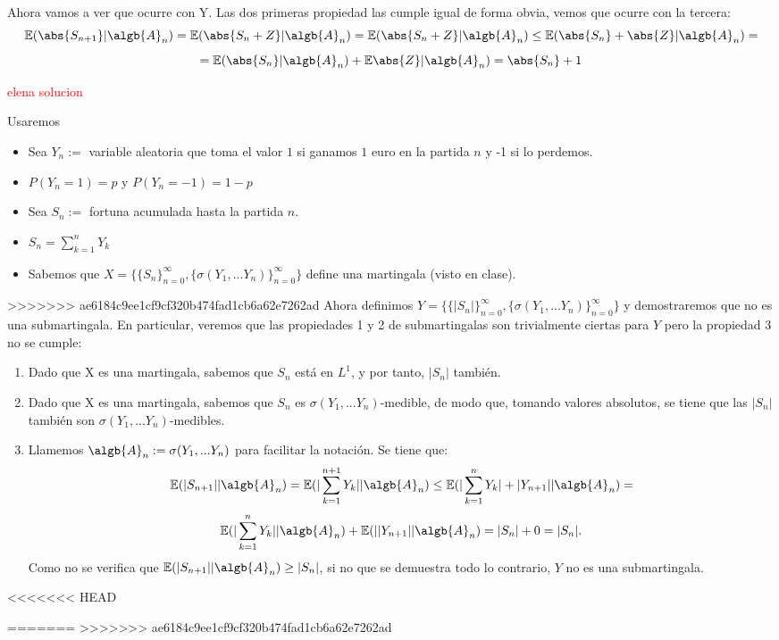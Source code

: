 \begin{problem}[3]
Ahora vamos a ver que ocurre con Y. Las dos primeras propiedad las cumple igual de forma obvia, vemos que ocurre con la tercera:
\[
\mathbb{E}(\abs{S_{n+1}}|\algb{A}_n) = \mathbb{E}(\abs{S_{n}+Z}|\algb{A}_n) = \mathbb{E}(\abs{S_{n}+Z}|\algb{A}_n) \leq \mathbb{E}(\abs{S_{n}}+\abs{Z}|\algb{A}_n) =
\]
\[
=\mathbb{E}(\abs{S_{n}}|\algb{A}_n)+\mathbb{E}\abs{Z}|\algb{A}_n) = \abs{S_n}+1    
\]


\textcolor{red}{elena solucion}
\begin{expla}
Usaremos
\begin{itemize}
\item Sea $Y_{n}:=$ variable aleatoria que toma el valor $1$ si ganamos $1$ euro en la partida $n$ y -1 si lo perdemos.
\item $P(Y_{n}=1)=p$ y $P(Y_{n}=-1)=1-p$
\item Sea $S_{n}:=$ fortuna acumulada hasta la partida $n$.
\item $S_{n}=\sum_{k=1}^{n} Y_k$
\item Sabemos que $X=\{\{S_n\}_{n=0}^{\infty},  \{\sigma(Y_1,...Y_n)\}_{n=0}^{\infty}\}$ define una martingala (visto en clase).
\end{itemize}
\end{expla}
>>>>>>> ae6184c9ee1cf9cf320b474fad1cb6a62e7262ad
Ahora definimos  $Y=\{\{|S_n|\}_{n=0}^{\infty},  \{\sigma(Y_1,...Y_n)\}_{n=0}^{\infty}\}$ y demostraremos que no es una submartingala. En particular, veremos que las propiedades 1 y 2 de submartingalas son trivialmente ciertas para $Y$ pero la propiedad 3 no se cumple:

\begin {enumerate}
\item Dado que X es una martingala, sabemos que $S_{n}$ está en $L^1$, y por tanto,  $|S_{n}|$ también.
\item Dado que X es una martingala, sabemos que  $S_{n}$ es $\sigma(Y_1,...Y_n)$-medible, de modo que, tomando valores absolutos, se tiene que las  $|S_{n}|$ también son $\sigma(Y_1,...Y_n)$-medibles.

\item Llamemos $\algb{A}_{n}:=\sigma(Y_1,...Y_n)$ para facilitar la notación. Se tiene que:
\[
 \mathbb{E}(|S_{n+1}||\algb{A}_{n}) = \mathbb{E}(|\sum_{k=1}^{n+1} Y_k||\algb{A}_{n}) \leq  \mathbb{E}(|\sum_{k=1}^{n} Y_k|+ |Y_{n+1}||\algb{A}_{n})  =
\]
\[
  \mathbb{E}(|\sum_{k=1}^{n} Y_k||\algb{A}_{n})  +  \mathbb{E}(| |Y_{n+1}||\algb{A}_{n}) = |S_{n}| + 0 = |S_{n}|.
\]
Como no se verifica que $ \mathbb{E}(|S_{n+1}||\algb{A}_{n}) \geq |S_n|$, si no que se demuestra todo lo contrario,  $Y$ no es una submartingala.
\end{enumerate}
<<<<<<< HEAD



=======
>>>>>>> ae6184c9ee1cf9cf320b474fad1cb6a62e7262ad


\end{problem}

